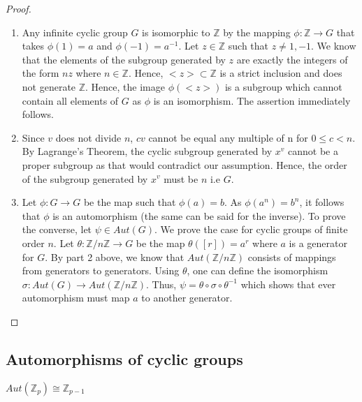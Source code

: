 \documentclass[main.tex]{subfiles}
\begin{document}
\begin{proof}
\begin{enumerate}
\item Any infinite cyclic group $G$ is isomorphic to $\mathbb{Z}$ by the mapping $\phi: \mathbb{Z} \rightarrow G$ that takes $\phi(1) = a$ and $\phi(-1) = a^{-1}$. Let $z \in \mathbb{Z}$ such that $z \neq 1,-1$. We know that the elements of the  subgroup generated by $z$ are exactly the integers of the form $nz$ where $n \in \mathbb{Z}$. Hence, $<z> \subset \mathbb{Z}$ is a strict inclusion and does not generate $\mathbb{Z}$. Hence, the image $\phi(<z>)$ is a subgroup which cannot contain all elements of $G$ as $\phi$ is an isomorphism. The assertion immediately follows.

\item  Since $v$ does not divide $n$,  $cv$ cannot be equal any multiple of n for $ 0 \leq c < n$. By Lagrange's Theorem, the cyclic subgroup generated by $x^v$ cannot be a proper subgroup as that would contradict our assumption. Hence, the order of the subgroup generated by $x^v$ must be $n$ i.e $G$.

\item Let $\phi: G \rightarrow G$ be the map such that $\phi(a) = b$. As $\phi(a^n) = b^n$, it follows that $\phi$ is an automorphism (the same can be said for the inverse). To prove the converse, let $\psi \in Aut(G)$. We prove the case for cyclic groups of finite order $n$. Let $\theta: \mathbb{Z}/n\mathbb{Z} \rightarrow G$ be the map $\theta([r]) = a^r$ where $a$ is a generator for $G$. By part 2 above, we know that $Aut(\mathbb{Z}/n\mathbb{Z})$ consists of mappings from generators to generators. Using $\theta$, one can define the isomorphism $\sigma:  Aut(G) \rightarrow Aut(\mathbb{Z}/n\mathbb{Z})$. Thus, 
$\psi = \theta \circ \sigma \circ \theta^{-1}$ which shows that ever automorphism must map $a$ to another generator. 
\end{enumerate}
\end{proof}

\subsection{Automorphisms of cyclic groups}

\begin{theorem}
$Aut(\mathbb{Z}_p) \cong \mathbb{Z}_{p-1}$
\end{theorem}
\end{document}
